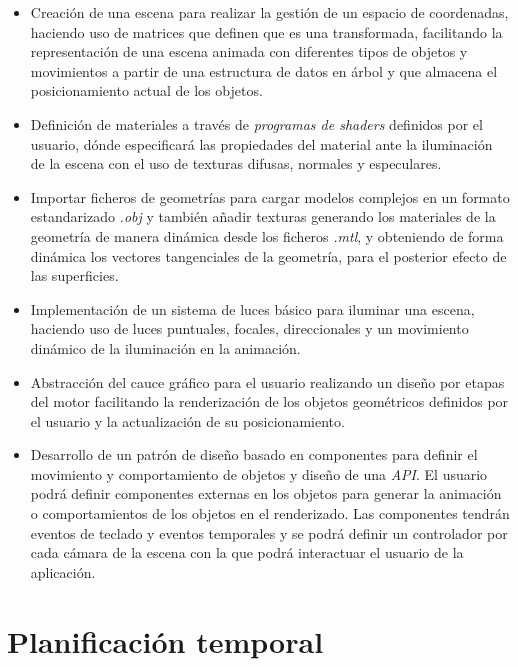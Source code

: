 \documentclass[a4paper]{book}
\begin{document}
\begin{itemize}
  \item Creación de una escena para realizar la gestión de un espacio de coordenadas, haciendo uso de
  matrices que definen que es una transformada, facilitando la representación de una escena animada con diferentes
  tipos de objetos y movimientos a partir de una estructura de datos en árbol y que almacena el posicionamiento 
  actual de los objetos.

  \item Definición de materiales a través de \textit{programas de shaders} definidos por el usuario, dónde especificará
  las propiedades del material ante la iluminación de la escena con el uso de texturas difusas, normales y especulares.

  \item Importar ficheros de geometrías para cargar modelos complejos en un formato estandarizado \textit{.obj}
  y también añadir texturas generando los materiales de la geometría de manera dinámica desde los ficheros \textit{.mtl},
  y obteniendo de forma dinámica los vectores tangenciales de la geometría, para el posterior efecto de las superficies.

  \item Implementación de un sistema de luces básico para iluminar una escena, haciendo uso de luces
  puntuales, focales, direccionales y un movimiento dinámico de la iluminación en la animación.

  \item Abstracción del cauce gráfico para el usuario realizando un diseño por etapas del motor
  facilitando la renderización de los objetos geométricos definidos por el usuario y la actualización 
  de su posicionamiento.

  \item Desarrollo de un patrón de diseño basado en componentes para definir el movimiento y
  comportamiento de objetos y diseño de una \textit{API}. El usuario podrá definir componentes
  externas en los objetos para generar la animación o comportamientos de los objetos en el renderizado.
  Las componentes tendrán eventos de teclado y eventos temporales y se podrá definir un controlador 
  por cada cámara de la escena con la que podrá interactuar el usuario de la aplicación.

\end{itemize}

\section{Planificación temporal}
\label{sec:planificacion-temporal}
\end{document}
